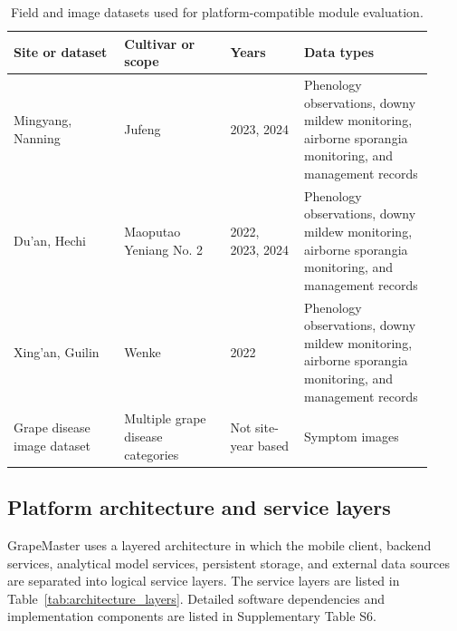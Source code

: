 \documentclass[12pt]{article}
\newcommand{\tablefontsize}{\fontsize{9pt}{11pt}\selectfont}
\begin{document}
\begin{table}[H]
\centering
\caption{Field and image datasets used for platform-compatible module evaluation.}
\label{tab:guangxi_field_data}
\tablefontsize
\begin{tabular}{@{}p{0.24\linewidth} p{0.23\linewidth} p{0.16\linewidth} p{0.29\linewidth}@{}}
\toprule
Site or dataset & Cultivar or scope & Years & Data types \\
\midrule
Mingyang, Nanning & Jufeng & 2023, 2024 & Phenology observations, downy mildew monitoring, airborne sporangia monitoring, and management records \\
Du'an, Hechi & Maoputao Yeniang No. 2 & 2022, 2023, 2024 & Phenology observations, downy mildew monitoring, airborne sporangia monitoring, and management records \\
Xing'an, Guilin & Wenke & 2022 & Phenology observations, downy mildew monitoring, airborne sporangia monitoring, and management records \\
Grape disease image dataset & Multiple grape disease categories & Not site-year based & Symptom images \\
\bottomrule
\end{tabular}
\end{table}

\subsection{Platform architecture and service layers}\label{platform-architecture-and-service-layers}

GrapeMaster uses a layered architecture in which the mobile client, backend services, analytical model services, persistent storage, and external data sources are separated into logical service layers. The service layers are listed in Table~\ref{tab:architecture_layers}. Detailed software dependencies and implementation components are listed in Supplementary Table S6.
\end{document}
